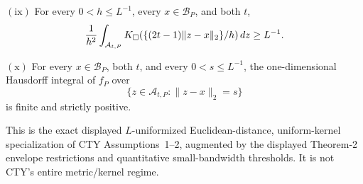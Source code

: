 \(\mathrm{(ix)}\) For every \(0<h\leq L^{-1}\), every \(x\in\mathcal B_P\), and both \(t\),
\[
 {1\over h^2}\int_{\mathcal A_{t,P}}
 K_\square(\{(2t-1)\lVert z-x\rVert_2\}/h)\,dz\geq L^{-1}.
\]

\(\mathrm{(x)}\) For every \(x\in\mathcal B_P\), both \(t\), and every \(0<s\leq L^{-1}\), the one-dimensional Hausdorff integral of \(f_P\) over
\[
 \{z\in\mathcal A_{t,P}:\lVert z-x\rVert_2=s\}
\]
is finite and strictly positive.

This is the exact displayed \(L\)-uniformized Euclidean-distance, uniform-kernel specialization of CTY Assumptions~1--2, augmented by the displayed Theorem-2 envelope restrictions and quantitative small-bandwidth thresholds.  It is not CTY's entire metric/kernel regime.